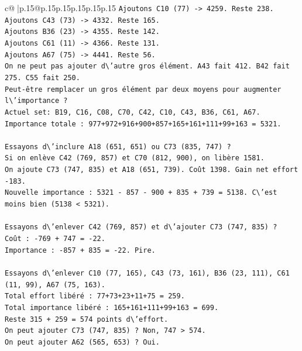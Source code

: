 \documentclass{article}
\begin{document}
{\begin{supertabular}{c@{$\;$}|p{.15\linewidth}@{}p{.15\linewidth}p{.15\linewidth}p{.15\linewidth}p{.15\linewidth}p{.15\linewidth}}
{{{\texttt{Ajoutons C10 (77) {-}> 4259. Reste 238.} \\
\texttt{Ajoutons C43 (73) {-}> 4332. Reste 165.} \\
\texttt{Ajoutons B36 (23) {-}> 4355. Reste 142.} \\
\texttt{Ajoutons C61 (11) {-}> 4366. Reste 131.} \\
\texttt{Ajoutons A67 (75) {-}> 4441. Reste 56.} \\
\texttt{On ne peut pas ajouter d\textbackslash{}'autre gros élément. A43 fait 412. B42 fait 275. C55 fait 250.} \\
\texttt{Peut{-}être remplacer un gros élément par deux moyens pour augmenter l\textbackslash{}'importance ?} \\
\texttt{Actuel set: B19, C16, C08, C70, C42, C10, C43, B36, C61, A67.} \\
\texttt{Importance totale : 977+972+916+900+857+165+161+111+99+163 = 5321.} \\
\\ 
\texttt{Essayons d\textbackslash{}'inclure A18 (651, 651) ou C73 (835, 747) ?} \\
\texttt{Si on enlève C42 (769, 857) et C70 (812, 900), on libère 1581.} \\
\texttt{On ajoute C73 (747, 835) et A18 (651, 739). Coût 1398. Gain net effort {-}183.} \\
\texttt{Nouvelle importance : 5321 {-} 857 {-} 900 + 835 + 739 = 5138. C\textbackslash{}'est moins bien (5138 < 5321).} \\
\\ 
\texttt{Essayons d\textbackslash{}'enlever C42 (769, 857) et d\textbackslash{}'ajouter C73 (747, 835) ?} \\
\texttt{Coût : {-}769 + 747 = {-}22.} \\
\texttt{Importance : {-}857 + 835 = {-}22. Pire.} \\
\\ 
\texttt{Essayons d\textbackslash{}'enlever C10 (77, 165), C43 (73, 161), B36 (23, 111), C61 (11, 99), A67 (75, 163).} \\
\texttt{Total effort libéré : 77+73+23+11+75 = 259.} \\
\texttt{Total importance libéré : 165+161+111+99+163 = 699.} \\
\texttt{Reste 315 + 259 = 574 points d\textbackslash{}'effort.} \\
\texttt{On peut ajouter C73 (747, 835) ? Non, 747 > 574.} \\
\texttt{On peut ajouter A62 (565, 653) ? Oui.} \\
}}}
\end{supertabular}}
\end{document}
